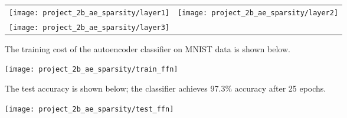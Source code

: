 \begin{longtabu}{X[c]X[c]}
    \texttt{[image: project\_2b\_ae\_sparsity/layer1]} &
    \texttt{[image: project\_2b\_ae\_sparsity/layer2]} \\
    \texttt{[image: project\_2b\_ae\_sparsity/layer3]}
\end{longtabu}

The training cost of the autoencoder classifier on MNIST data is shown below.

\begin{center}
    \texttt{[image: project\_2b\_ae\_sparsity/train\_ffn]}
\end{center}

The test accuracy is shown below; the classifier achieves 97.3\% accuracy
after 25 epochs.

\begin{center}
    \texttt{[image: project\_2b\_ae\_sparsity/test\_ffn]}
\end{center}